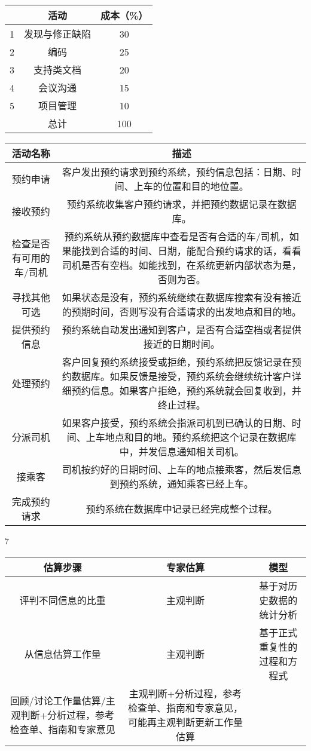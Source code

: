 \documentclass{book}        %
\begin{document}
\begin{tabular}{|c|c|c|}
\hline
\:&活动&成本（\%）\\
\hline
1&发现与修正缺陷&30\\
\hline
2&编码&25\\
\hline
3&支持类文档&20\\
\hline
4&会议沟通&15\\
\hline
5&项目管理&10\\
\hline
\:&总计&100\\
\hline
\end{tabular}


\begin{tabular}{|c|c|}
\hline
活动名称&描述\\
\hline
预约申请&客户发出预约请求到预约系统，预约信息包括：日期、时间、上车的位置和目的地位置。\\
\hline
接收预约&预约系统收集客户预约请求，并把预约数据记录在数据库。\\
\hline
检查是否有可用的车/司机&预约系统从预约数据库中查看是否有合适的车/司机，如果能找到合适的时间、日期，能配合预约请求的话，看看司机是否有空档。如能找到，在系统更新内部状态为是，否则为否。 \\
\hline
寻找其他可选&如果状态是没有，预约系统继续在数据库搜索有没有接近的预期时间，否则写没有合适请求的出发地点和目的地。 \\
\hline
提供预约信息&预约系统自动发出通知到客户，是否有合适空档或者提供接近的日期时间。 \\
\hline
处理预约&客户回复预约系统接受或拒绝，预约系统把反馈记录在预约数据库。如果反馈是接受，预约系统会继续统计客户详细预约信息。如果客户拒绝，预约系统就会回复收到，并终止过程。 \\
\hline
分派司机&如果客户接受，预约系统会指派司机到已确认的日期、时间、上车地点和目的地。预约系统把这个记录在数据库中，并发信息通知相关司机。 \\
\hline
接乘客&司机按约好的日期时间、上车的地点接乘客，然后发信息到预约系统，通知乘客已经上车。\\
\hline
完成预约请求&预约系统在数据库中记录已经完成整个过程。\\
\hline
\end{tabular}

7

\begin{tabular}{|c|c|c|}
\hline
估算步骤&专家估算&模型\\
\hline
评判不同信息的比重&主观判断&基于对历史数据的统计分析\\
\hline
从信息估算工作量&主观判断&基于正式重复性的过程和方程式 \\
\hline
回顾/讨论工作量估算/主观判断+分析过程，参考检查单、指南和专家意见&主观判断+分析过程，参考检查单、指南和专家意见，可能再主观判断更新工作量估算 \\
\hline
\end{tabular}
\end{document}
